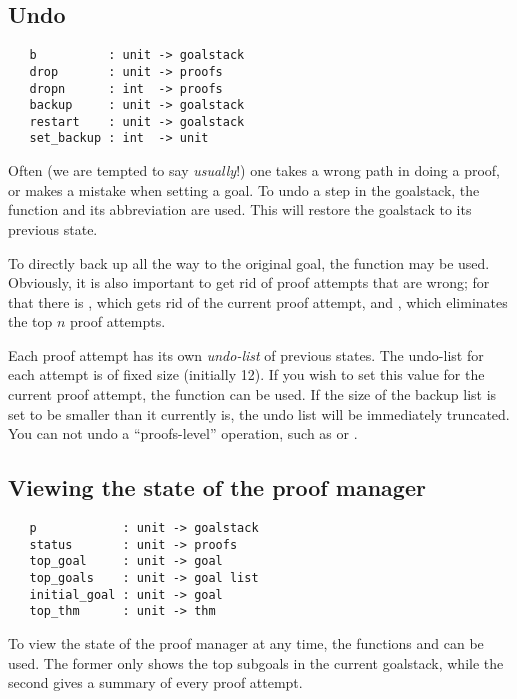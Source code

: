 \subsection{Undo}

\begin{hol}
\begin{verbatim}
   b          : unit -> goalstack
   drop       : unit -> proofs
   dropn      : int  -> proofs
   backup     : unit -> goalstack
   restart    : unit -> goalstack
   set_backup : int  -> unit
\end{verbatim}
\end{hol}

Often (we are tempted to say {\it usually}!) one takes a wrong path
in doing a proof, or makes a mistake when setting a goal. To undo a step
in the goalstack, the function  and its abbreviation
 are used. This will restore the goalstack to its previous
state.


To directly back up all the way to the original goal, the function
 may be used. Obviously, it is also important to get
rid of proof attempts that are wrong; for that there is ,
which gets rid of the current proof attempt, and , which
eliminates the top $n$ proof attempts.


Each proof attempt has its own \emph{undo-list} of previous
states. The undo-list for each attempt is of fixed size (initially
12). If you wish to set this value for the current proof attempt, the
function  can be used. If the size of the backup
list is set to be smaller than it currently is, the undo list will be
immediately truncated. You can not undo a ``proofs-level'' operation, such
as  or .

\subsection{Viewing the state of the proof manager}

\begin{hol}
\begin{verbatim}
   p            : unit -> goalstack
   status       : unit -> proofs
   top_goal     : unit -> goal
   top_goals    : unit -> goal list
   initial_goal : unit -> goal
   top_thm      : unit -> thm
\end{verbatim}
\end{hol}

To view the state of the proof manager at any time, the functions
 and  can be used. The former only shows
the top subgoals in the current goalstack, while the second gives a
summary of every proof attempt.

